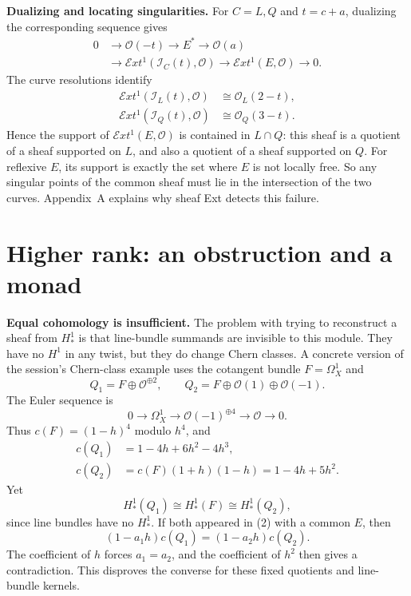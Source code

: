 \documentclass[11pt,a4paper]{article}
\theoremstyle{remark}
\begin{document}
\textbf{Dualizing and locating
singularities.}
For $C=L,Q$ and $t=c+a$, dualizing
the corresponding sequence gives
$$
\begin{aligned}
0&\longrightarrow\mathcal{O}(-t)
\longrightarrow E^*
\longrightarrow\mathcal{O}(a)\\
&\longrightarrow\mathcal{E}xt^1
(\mathcal{I}_C(t),\mathcal{O})
\longrightarrow\mathcal{E}xt^1
(E,\mathcal{O})\longrightarrow0.
\end{aligned}
$$
The curve resolutions identify
$$
\begin{aligned}
\mathcal{E}xt^1
(\mathcal{I}_L(t),\mathcal{O})
&\cong\mathcal{O}_L(2-t),\\
\mathcal{E}xt^1
(\mathcal{I}_Q(t),\mathcal{O})
&\cong\mathcal{O}_Q(3-t).
\end{aligned}
$$
Hence the support of
$\mathcal{E}xt^1(E,\mathcal{O})$
is contained in $L\cap Q$: this sheaf
is a quotient of a sheaf supported
on $L$, and also a quotient of a sheaf
supported on $Q$. For reflexive $E$,
its support is exactly the set where
$E$ is not locally free.
So any singular points of the common
sheaf must lie in the intersection
of the two curves. Appendix~A explains
why sheaf Ext detects this failure.

\section{Higher rank: an obstruction
and a monad}

\textbf{Equal cohomology is insufficient.}
The problem with trying to reconstruct
a sheaf from $H^1_*$ is that line-bundle
summands are invisible to this module.
They have no $H^1$ in any twist, but
they do change Chern classes.
A concrete version of the session's
Chern-class example uses the cotangent
bundle $F=\Omega^1_X$ and
$$
Q_1=F\oplus\mathcal{O}^{\oplus2},
\qquad Q_2=F\oplus\mathcal{O}(1)
\oplus\mathcal{O}(-1).
$$
The Euler sequence is
$$
0\longrightarrow\Omega^1_X
\longrightarrow\mathcal{O}(-1)^{\oplus4}
\longrightarrow\mathcal{O}
\longrightarrow0.
$$
Thus $c(F)=(1-h)^4$ modulo $h^4$, and
$$
\begin{aligned}
c(Q_1)&=1-4h+6h^2-4h^3,\\
c(Q_2)&=c(F)(1+h)(1-h)
=1-4h+5h^2.
\end{aligned}
$$
Yet
$$
H^1_*(Q_1)\cong H^1_*(F)
\cong H^1_*(Q_2),
$$
since line bundles have no $H^1_*$.
If both appeared in (2) with a common
$E$, then
$$
(1-a_1h)c(Q_1)=(1-a_2h)c(Q_2).
$$
The coefficient of $h$ forces
$a_1=a_2$, and the coefficient of
$h^2$ then gives a contradiction.
This disproves the converse for
these fixed quotients and
line-bundle kernels.
\end{document}
